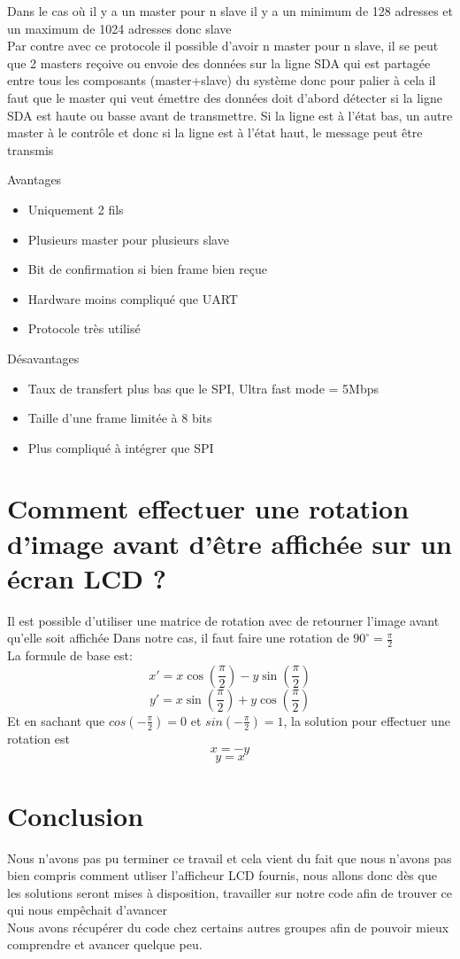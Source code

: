 Dans le cas où il y a un master pour n slave il y a un minimum de 128 adresses et un maximum de 1024 adresses donc slave\\
Par contre avec ce protocole il possible d'avoir n master pour n slave, il se peut que 2 masters reçoive ou envoie des données sur la ligne SDA qui est partagée entre tous les composants (master+slave) du système donc pour palier à cela il faut que le master qui veut émettre des données doit d'abord détecter si la ligne SDA est haute ou basse avant de transmettre. Si la ligne est à l'état bas, un autre master à le contrôle et donc si la ligne est à l'état haut, le message peut être transmis

Avantages
\begin{itemize}
   \item Uniquement 2 fils
   \item Plusieurs master pour plusieurs slave
   \item Bit de confirmation si bien frame bien reçue
   \item Hardware moins compliqué que UART
   \item Protocole très utilisé
\end{itemize}

Désavantages
\begin{itemize}
   \item Taux de transfert plus bas que le SPI, Ultra fast mode = 5Mbps
   \item Taille d'une frame limitée à 8 bits
   \item Plus compliqué à intégrer que SPI
\end{itemize}

\section{Comment effectuer une rotation d'image avant d'être affichée sur un écran LCD ?}
Il est possible d'utiliser une matrice de rotation avec de retourner l'image avant qu'elle soit affichée
Dans notre cas, il faut faire une rotation de $90^{\circ}=\frac{\pi}{2}$\\
La formule de base est:
$$x'=x\cos(\frac{\pi}{2})-y\sin(\frac{\pi}{2})$$
$$y'=x\sin(\frac{\pi}{2})+y\cos(\frac{\pi}{2})$$
Et en sachant que $cos(-\frac{\pi}{2})=0$ et $sin(-\frac{\pi}{2})=1$, la solution pour effectuer une rotation est
$$x=-y$$
$$y=x$$ 


\section{Conclusion}
Nous n'avons pas pu terminer ce travail et cela vient du fait que nous n'avons pas bien compris comment utliser l'afficheur LCD fournis, nous allons donc dès que les solutions seront mises à disposition, travailler sur notre code afin de trouver ce qui nous empêchait d'avancer\\
Nous avons récupérer du code chez certains autres groupes afin de pouvoir mieux comprendre et avancer quelque peu.



